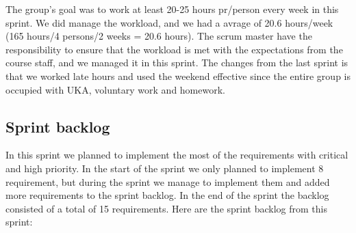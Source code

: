	The group's goal was to work at least 20-25 hours pr/person every week in this sprint. 
	We did manage the workload, and we had a avrage of 20.6 hours/week (165 hours/4 persons/2 weeks = 20.6 hours). 
	The scrum master have the responsibility to ensure that the workload is met with the
	expectations from the course staff, and we managed it in this sprint.
	The changes from the last sprint is that we worked late hours and used the weekend effective
	since the entire group is occupied with UKA, voluntary work and homework.

\subsection{Sprint backlog}

	In this sprint we planned to implement the most of the requirements with critical and high
	priority. In the start of the sprint we only planned to implement 8 requirement, but
	during the sprint we manage to implement them and added more requirements to the sprint backlog.
	In the end of the sprint the backlog consisted of a total of 15 requirements. Here are the
	sprint backlog from this sprint:

